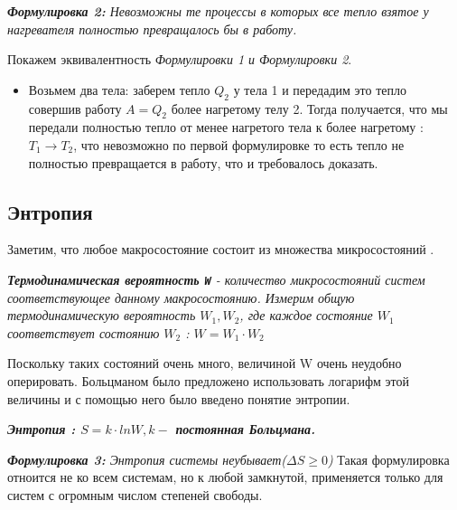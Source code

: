 \vspace{5px}

\textit{\textbf{Формулировка 2:} Невозможны те процессы в которых все тепло взятое у нагревателя полностью превращалось бы в работу.}

\vspace{5px}

Покажем эквивалентность\textit{ Формулировки 1 и Формулировки 2}.

\vspace{4px}
\begin{itemize}
    \item Возьмем два тела: заберем тепло $Q_2$ у тела 1 и передадим это тепло совершив работу $A = Q_2$ более нагретому телу 2. Тогда получается, что мы передали полностью тепло от менее нагретого тела к более нагретому : $T_1 \to T_2$, что невозможно по первой формулировке то есть тепло не полностью превращается в работу, что и требовалось доказать.
\end{itemize}
\subsection{Энтропия}
Заметим, что любое макросостояние состоит из множества микросостояний .

\vspace{4px}

 \textit{\textbf{Термодинамическая вероятность \texttt{W}} - количество микросостояний систем соответствующее данному макросостоянию. Измерим общую термодинамическую вероятность $W_1, W_2$, где каждое состояние $W_1$ соответствует состоянию $W_2$ : $W = W_1 \cdot W_2$}

\vspace{4px}

Поскольку таких состояний очень много, величиной W очень неудобно оперировать. Больцманом было предложено использовать логарифм этой величины и с помощью него было введено понятие энтропии.

\vspace{5px}

\textit{\textbf{Энтропия : $S = k \cdot ln{W}, k - $ постоянная Больцмана.}}

\vspace{5px}

\textit{\textbf{Формулировка 3: }Энтропия системы неубывает($\Delta S \geq  0 $)}
Такая формулировка отноится не ко всем системам, но к любой замкнутой, применяется только для систем с огромным числом степеней свободы.


